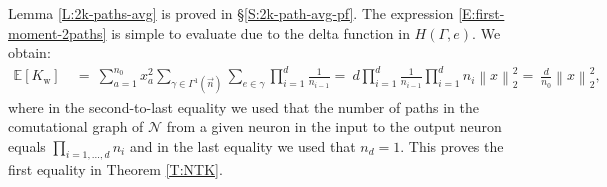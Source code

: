 \documentclass[11pt, reqno]{amsart}
\newcommand{\E}[1]{{\mathbb E}\left [#1\right]}
\newcommand{\norm}[1]{\left\lVert#1\right\rVert}
\newcommand{\mN}{\mathcal N}
\newcommand{\Kw}{K_{\mathrm{w}}}
\begin{document}
\noindent Lemma \ref{L:2k-paths-avg} is proved in \S \ref{S:2k-path-avg-pf}. The expression \eqref{E:first-moment-2paths} is simple to evaluate due to the delta function in $H(\Gamma,e).$ We obtain:
\begin{align}
  \E{\Kw} ~&=~\sum_{a=1}^{n_0}x_a^2\sum_{\gamma\in \Gamma^1(\vec{n})} \sum_{e\in \gamma} \prod_{i=1}^d\frac{1}{n_{i-1}}=~d\prod_{i=1}^d\frac{1}{n_{i-1}}\prod_{i=1}^dn_i\norm{x}_2^2=~\frac{d}{n_0}\norm{x}_2^2,\label{E:K-1st-moment}
\end{align}
where in the second-to-last equality we used that the number of paths in the comutational graph of $\mN$ from a given neuron in the input to the output neuron equals $\prod_{i=1,\ldots,d} n_i$ and in the last equality we used that $n_d=1.$ This proves the first equality in Theorem \ref{T:NTK}.
\end{document}

